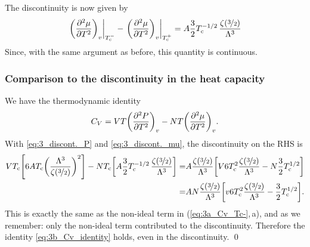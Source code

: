 \documentclass[11pt,letter, swedish, english
]{article}
\begin{document}
The discontinuity is now given by
\begin{equation}\label{eq:3_discont._mu}
\eval{\qty(\pdv[2]{\mu}{T})_v}_{\Tc^-}
-\eval{\qty(\pdv[2]{\mu}{T})_v}_{\Tc^+}
=A\frac{3}{2}
\Tc^{-1/2}\,\frac{\zeta(\nicefrac{3}{2})}{\Lambda^3}
\end{equation}
Since, with the same argument as before, this quantity is continuous.

\subsubsection{Comparison to the discontinuity in the heat capacity}
We have the thermodynamic identity
\begin{equation}\label{eq:3b_Cv_identity}
C_V=VT\qty(\pdv[2]{P}{T})_v-NT\qty(\pdv[2]{\mu}{T})_v.
\end{equation}
With \eqref{eq:3_discont._P} and \eqref{eq:3_discont._mu}, the
discontinuity on the RHS is
\begin{equation}
\begin{aligned}
VT_{\text{c}}\qty[6AT_{\text{c}}\qty(\frac{\Lambda^3}{\zeta(\nicefrac{3}{2})})^2]
-NT_{\text{c}}\qty[A\frac{3}{2}
T_{\text{c}}^{-1/2}\,\frac{\zeta(\nicefrac{3}{2})}{\Lambda^3}]
=&A\frac{\zeta(\nicefrac{3}{2})}{\Lambda^3}
\qty[V6T_{\text{c}}^2\frac{\zeta(\nicefrac{3}{2})}{\Lambda^3}
-N\frac{3}{2}T_{\text{c}}^{1/2}]\\
=&AN\frac{\zeta(\nicefrac{3}{2})}{\Lambda^3}
\qty[v6T_{\text{c}}^2\frac{\zeta(\nicefrac{3}{2})}{\Lambda^3}
-\frac{3}{2}T_{\text{c}}^{1/2}].
\end{aligned}
\end{equation}
This is exactly the same as the non-ideal term in
(\ref{eq:3a_Cv_Tc-},\,a), and as we remember: only the non-ideal term
contributed to the discontinuity. Therefore the identity
\eqref{eq:3b_Cv_identity} holds, even in the discontinuity.
\qed
\end{document}
